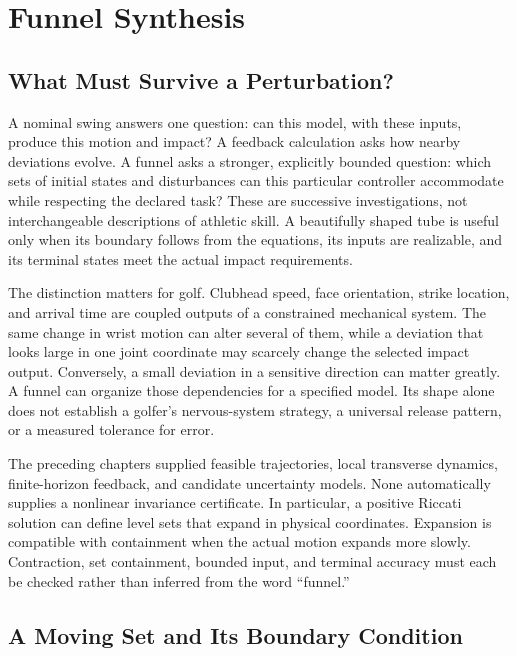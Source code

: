 \documentclass[12pt, openany]{book}
\theoremstyle{plain}
\begin{document}
\setcounter{chapter}{6}

\chapter{Funnel Synthesis}
\label{ch:funnel_synthesis}

\section{What Must Survive a Perturbation?}

A nominal swing answers one question: can this model, with these inputs, produce this motion and impact? A feedback calculation asks how nearby deviations evolve. A funnel asks a stronger, explicitly bounded question: which sets of initial states and disturbances can this particular controller accommodate while respecting the declared task? These are successive investigations, not interchangeable descriptions of athletic skill. A beautifully shaped tube is useful only when its boundary follows from the equations, its inputs are realizable, and its terminal states meet the actual impact requirements.

The distinction matters for golf. Clubhead speed, face orientation, strike location, and arrival time are coupled outputs of a constrained mechanical system. The same change in wrist motion can alter several of them, while a deviation that looks large in one joint coordinate may scarcely change the selected impact output. Conversely, a small deviation in a sensitive direction can matter greatly. A funnel can organize those dependencies for a specified model. Its shape alone does not establish a golfer's nervous-system strategy, a universal release pattern, or a measured tolerance for error.

The preceding chapters supplied feasible trajectories, local transverse dynamics, finite-horizon feedback, and candidate uncertainty models. None automatically supplies a nonlinear invariance certificate. In particular, a positive Riccati solution can define level sets that expand in physical coordinates. Expansion is compatible with containment when the actual motion expands more slowly. Contraction, set containment, bounded input, and terminal accuracy must each be checked rather than inferred from the word ``funnel.''

\section{A Moving Set and Its Boundary Condition}
\end{document}

